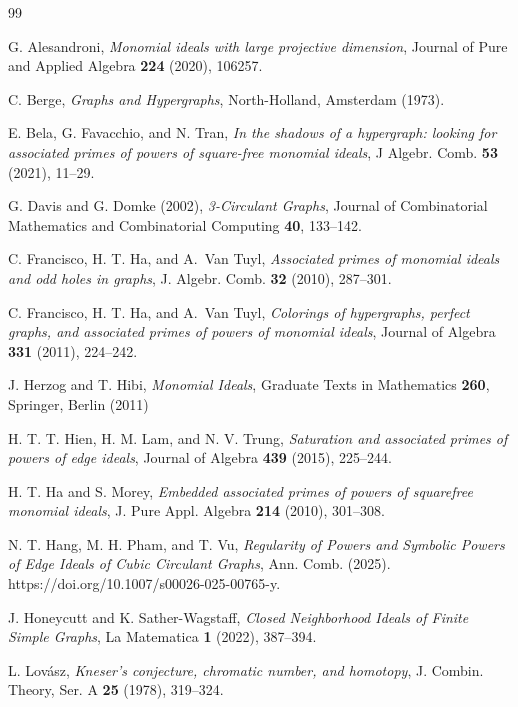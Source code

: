 \documentclass[12pt,reqno,twoside]{amsart}
\theoremstyle{definition}
\theoremstyle{plain}
\theoremstyle{remark}
\numberwithin{equation}{section}
\begin{document}
\begin{thebibliography}{99}



G. Alesandroni,
{\em Monomial ideals with large projective dimension}, Journal of Pure and Applied Algebra {\bf 224} (2020), 106257.



C. Berge, 
{\em Graphs and Hypergraphs}, North-Holland, Amsterdam (1973).

E. Bela, G. Favacchio, and N. Tran,
\emph{In the shadows of a hypergraph: looking for associated primes of powers of square-free monomial ideals}, J Algebr. Comb. {\bf 53} (2021), 11--29.



 G. Davis and G. Domke (2002), \textit{3-Circulant Graphs}, Journal of Combinatorial Mathematics and Combinatorial Computing {\bf 40}, 133--142.

 C. Francisco, H. T. Ha, and A.~Van Tuyl, 
\emph{Associated primes of monomial ideals and odd holes in graphs}, J. Algebr. Comb. {\bf 32} (2010), 287--301.

 
 C. Francisco, H. T. Ha, and A.~Van Tuyl, 
\emph{Colorings of hypergraphs, perfect graphs, and associated primes of powers of monomial ideals}, Journal of Algebra {\bf 331} (2011), 224--242.
 

J. Herzog and T. Hibi,
\emph{Monomial Ideals},
Graduate Texts in Mathematics {\bf 260}, Springer, Berlin (2011)

H. T. T. Hien, H. M. Lam, and N. V. Trung,
{\em Saturation and associated primes of powers of edge ideals}, Journal of Algebra {\bf 439} (2015), 225--244.


H. T. Ha and S. Morey,
\emph{Embedded associated primes of powers of squarefree monomial ideals}, J. Pure Appl. Algebra {\bf 214} (2010), 301--308.


N. T. Hang, M. H. Pham, and T. Vu,
{\em Regularity of Powers and Symbolic Powers of Edge Ideals of Cubic Circulant Graphs}, Ann. Comb. (2025). https://doi.org/10.1007/s00026-025-00765-y. 

J. Honeycutt and K. Sather-Wagstaff, \emph{Closed Neighborhood Ideals of Finite Simple Graphs}, La Matematica {\bf 1} (2022), 387--394.

 

 L. Lov\'asz, 
{\em Kneser's conjecture, chromatic number, and homotopy}, J. Combin. Theory, Ser. A {\bf 25} (1978), 319--324.


\end{thebibliography}
\end{document}

